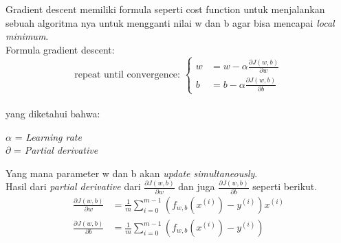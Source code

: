 Gradient descent memiliki formula seperti cost function untuk menjalankan sebuah algoritma nya untuk mengganti nilai w dan b agar bisa mencapai \textit{local minimum}.\\
Formula gradient descent\cite{ruder2016overview}: \\
\begin{equation}
\text{repeat until convergence: } 
\left\lbrace
\begin{aligned}
  w &= w - \alpha \frac{\partial J(w,b)}{\partial w} \\
  b &= b - \alpha \frac{\partial J(w,b)}{\partial b}
\end{aligned}
\right.
\end{equation}
\label{eq:2.gradient}
\\
yang diketahui bahwa:
\begin{center}
    $\alpha$ = \textit{Learning rate}\\
    $\partial$ = \textit{Partial derivative}
\end{center}
Yang mana parameter w dan b akan \textit{update simultaneously}.\\
Hasil dari \textit{partial derivative} dari $\frac{\partial J(w,b)}{\partial w}$ dan juga $\frac{\partial J(w,b)}{\partial b}$ seperti berikut. \\
\begin{equation}
    \begin{aligned}
    \frac{\partial J(w,b)}{\partial w} &= \frac{1}{m} \sum_{i=0}^{m-1} \left( f_{w,b}\left(x^{(i)}\right) - y^{(i)} \right) x^{(i)} \\
    \frac{\partial J(w,b)}{\partial b} &= \frac{1}{m} \sum_{i=0}^{m-1} \left( f_{w,b}\left(x^{(i)}\right) - y^{(i)} \right)
    \end{aligned}
\end{equation}
\label{eq:2.partialgradient}

